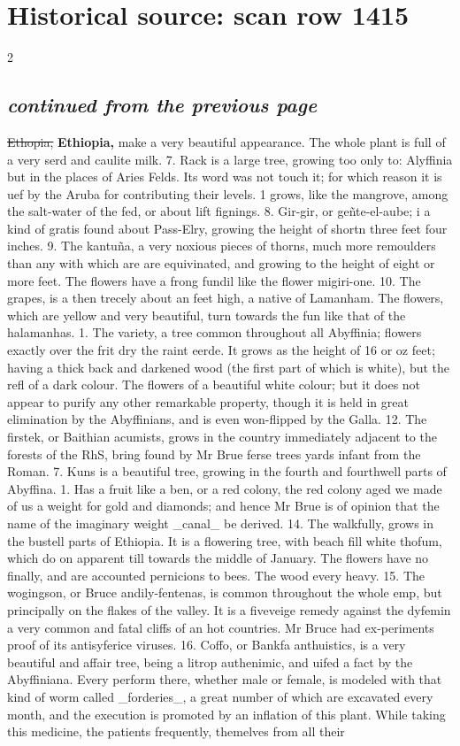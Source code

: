 \documentclass[10pt]{article}
\begin{document}
\section*{Historical source: scan row 1415}
\begin{multicols}{2}
\subsection*{\textit{continued from the previous page}}
\sout{Ethopia,} \textbf{Ethiopia,} make a very beautiful appearance. The whole plant is full of a very serd and caulite milk. 7. Rack is a large tree, growing too only to: Alyffinia but in the places of Aries Felds. Its word was not touch it; for which reason it is uef by the Aruba for contributing their levels. 1 grows, like the mangrove, among the salt-water of the fed, or about lift fignings. 8. Gir-gir, or geñte-el-aube; i a kind of gratis found about Pass-Elry, growing the height of shortn three feet four inches. 9. The kantuña, a very noxious pieces of thorns, much more remoulders than any with which are are equivinated, and growing to the height of eight or more feet. The flowers have a frong fundil like the flower migiri-one. 10. The grapes, is a then trecely about an feet high, a native of Lamanham. The flowers, which are yellow and very beautiful, turn towards the fun like that of the halamanhas. 1. The variety, a tree common throughout all Abyffinia; flowers exactly over the frit dry the raint eerde. It grows as the height of 16 or oz feet; having a thick back and darkened wood (the first part of which is white), but the refl of a dark colour. The flowers of a beautiful white colour; but it does not appear to purify any other remarkable property, though it is held in great elimination by the Abyffinians, and is even won-flipped by the Galla. 12. The firstek, or Baithian acumists, grows in the country immediately adjacent to the forests of the RhS, bring found by Mr Brue ferse trees yards infant from the Roman. 7. Kuns is a beautiful tree, growing in the fourth and fourthwell parts of Abyffina. 1. Has a fruit like a ben, or a red colony, the red colony aged we made of us a weight for gold and diamonds; and hence Mr Brue is of opinion that the name of the imaginary weight \_canal\_ be derived. 14. The walkfully, grows in the bustell parts of Ethiopia. It is a flowering tree, with beach fill white thofum, which do on apparent till towards the middle of January. The flowers have no finally, and are accounted pernicions to bees. The wood every heavy. 15. The wogingson, or Bruce andily-fentenas, is common throughout the whole emp, but principally on the flakes of the valley. It is a fiveveige remedy against the dyfemin a very common and fatal cliffs of an hot countries. Mr Bruce had ex-periments proof of its antisyferice viruses. 16. Coffo, or Bankfa anthuistics, is a very beautiful and affair tree, being a litrop authenimic, and uifed a fact by the Abyffiniana. Every perform there, whether male or female, is modeled with that kind of worm called \_forderies\_, a great number of which are excavated every month, and the execution is promoted by an inflation of this plant. While taking this medicine, the patients frequently, themelves from all their 
\end{multicols}
\end{document}
